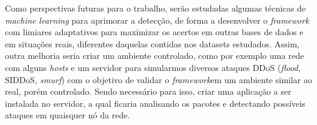 Como perspectivas futuras para o trabalho, serão estudadas algumas técnicas de \textit{machine learning}  para aprimorar a detecção, de forma a desenvolver o \textit{framework} com limiares adaptativos para maximizar os acertos em outras bases de dados e em situações reais, diferentes daquelas contidas nos datasets estudados. Assim, outra melhoria seria criar um ambiente controlado, como por exemplo uma rede com alguns \textit{hosts} e um servidor para simularmos diversos ataques DDoS (\textit{flood}, SIDDoS, \textit{smurf}) com o objetivo de validar o \textit{framework}em um ambiente similar ao real, porém controlado. Sendo necessário para isso, criar uma aplicação a ser instalada no servidor, a qual ficaria analisando os pacotes e detectando possíveis ataques em quaisquer nó da rede.


